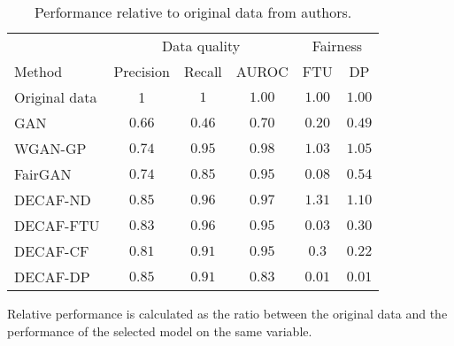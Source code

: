     \begin{table}[h]\centering
    \caption{Performance relative to original data from authors.}
    \label{tab:exp2}
    \begin{tabular}{l|ccccc}
        
    \hline 
                    & \multicolumn{3}{c|}{Data quality}                & \multicolumn{2}{c}{Fairness} \\ \cline{2-6} 
    Method          & Precision & Recall & \multicolumn{1}{c|}{AUROC} & FTU           & DP           \\ \hline   
    Original data   & 1     & $1$  & \multicolumn{1}{c|}{$1.00$} & $1.00$  & $1.00$ \\
    GAN             & $0.66$ & $0.46$ & \multicolumn{1}{c|}{$0.70$} & $0.20$   & $0.49$  \\
    WGAN-GP         & $0.74$ & $0.95$ & \multicolumn{1}{c|}{$0.98$} & $1.03$   & $1.05$  \\
    FairGAN         & $0.74$ & $0.85$ & \multicolumn{1}{c|}{$0.95$} & $0.08$   & $0.54$  \\
    DECAF-ND        & $0.85$ & $0.96$ & \multicolumn{1}{c|}{$0.97$} & $1.31$   & $1.10$  \\
    DECAF-FTU       & $0.83$ & $0.96$ & \multicolumn{1}{c|}{$0.95$} & $0.03$   & $0.30$  \\
    DECAF-CF        & $0.81$ & $0.91$ & \multicolumn{1}{c|}{$0.95$} & $0.3$   & $0.22$  \\
    DECAF-DP        & $0.85$ & $0.91$ & \multicolumn{1}{c|}{$0.83$} & $0.01$   & $0.01$      \\ \hline
    \end{tabular}
    \end{table}
    
    Relative performance is calculated as the ratio between the original data and the performance of the selected model on the same variable.
    
